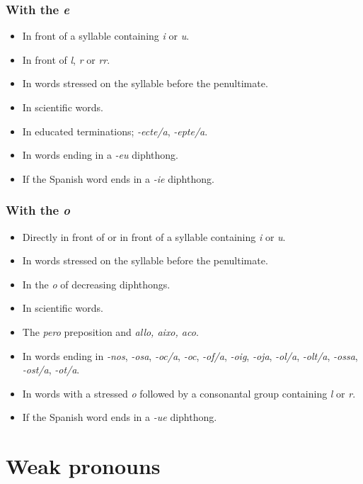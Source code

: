 \documentclass{article}
\begin{document}
\subsubsection*{With the \emph{e}}

\begin{itemize}
    \item In front of a syllable containing \emph{i} or \emph{u}.
    \item In front of \emph{l}, \emph{r} or \emph{rr}.
    \item In words stressed on the syllable before the penultimate.
    \item In scientific words.
    \item In educated terminations; \emph{-ecte/a}, \emph{-epte/a}.
    \item In words ending in a \emph{-eu} diphthong.
    \item If the Spanish word ends in a \emph{-ie} diphthong.
\end{itemize}

\subsubsection*{With the \emph{o}}

\begin{itemize}
    \item Directly in front of or in front of a syllable containing \emph{i} or
    \emph{u}.
    \item In words stressed on the syllable before the penultimate.
    \item In the \emph{o} of decreasing diphthongs.
    \item In scientific words.
    \item The \emph{pero} preposition and \emph{allo, aixo, aco}.
    \item In words ending in \emph{-nos}, \emph{-osa}, \emph{-oc/a}, \emph{-oc},
    \emph{-of/a}, \emph{-oig}, \emph{-oja}, \emph{-ol/a}, \emph{-olt/a},
    \emph{-ossa}, \emph{-ost/a}, \emph{-ot/a}.
    \item In words with a stressed \emph{o} followed by a consonantal group
    containing \emph{l} or \emph{r}.
    \item If the Spanish word ends in a \emph{-ue} diphthong.
\end{itemize}

\section*{Weak pronouns}
\end{document}
